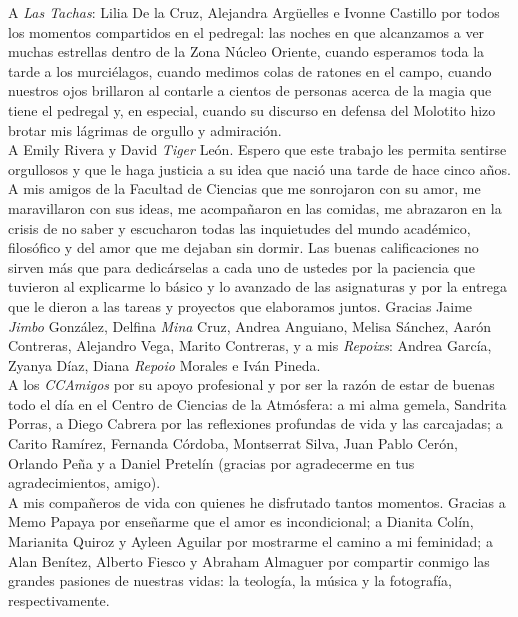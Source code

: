 A \textit{Las Tachas}: Lilia De la Cruz, Alejandra Argüelles e Ivonne Castillo por todos los momentos compartidos en el pedregal: las noches en que alcanzamos a ver muchas estrellas dentro de la Zona Núcleo Oriente, cuando esperamos toda la tarde a los murciélagos, cuando medimos colas de ratones en el campo, cuando nuestros ojos brillaron al contarle a cientos de personas acerca de la magia que tiene el pedregal y, en especial, cuando su discurso en defensa del Molotito hizo brotar mis lágrimas de orgullo y admiración.\\ 

A Emily Rivera y David \textit{Tiger} León. Espero que este trabajo les permita sentirse orgullosos y que le haga justicia a su idea que nació una tarde de hace cinco años.\\

A mis amigos de la Facultad de Ciencias que me sonrojaron con su amor, me maravillaron con sus ideas, me acompañaron en las comidas, me abrazaron en la crisis de no saber y escucharon todas las inquietudes del mundo académico, filosófico y del amor que me dejaban sin dormir. Las buenas calificaciones no sirven más que para dedicárselas a cada uno de ustedes por la paciencia que tuvieron al explicarme lo básico y lo avanzado de las asignaturas y por la entrega que le dieron a las tareas y proyectos que elaboramos juntos. Gracias Jaime \textit{Jimbo} González, Delfina \textit{Mina} Cruz, Andrea Anguiano, Melisa Sánchez, Aarón Contreras, Alejandro Vega, Marito Contreras, y a mis \textit{Repoixs}: Andrea García, Zyanya Díaz, Diana \textit{Repoio} Morales e Iván Pineda.\\

A los \textit{CCAmigos} por su apoyo profesional y por ser la razón de estar de buenas todo el día en el Centro de Ciencias de la Atmósfera: a mi alma gemela, Sandrita Porras, a Diego Cabrera por las reflexiones profundas de vida y las carcajadas; a Carito Ramírez, Fernanda Córdoba, Montserrat Silva, Juan Pablo Cerón, Orlando Peña y a Daniel Pretelín (gracias por agradecerme en tus agradecimientos, amigo).\\

A mis compañeros de vida con quienes he disfrutado tantos momentos. Gracias a Memo Papaya por enseñarme que el amor es incondicional; a Dianita Colín, Marianita Quiroz y Ayleen Aguilar por mostrarme el camino a mi feminidad; a Alan Benítez, Alberto Fiesco y Abraham Almaguer por compartir conmigo las grandes pasiones de nuestras vidas: la teología, la música y la fotografía, respectivamente.\\

